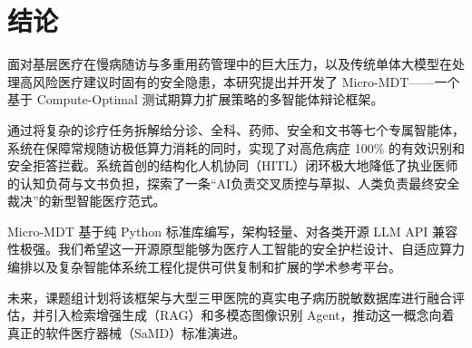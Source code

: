 \documentclass[11pt,a4paper]{ctexart}
\begin{document}
\newpage
\section{结论}

面对基层医疗在慢病随访与多重用药管理中的巨大压力，以及传统单体大模型在处理高风险医疗建议时固有的安全隐患，本研究提出并开发了 Micro-MDT——一个基于 Compute-Optimal 测试期算力扩展策略的多智能体辩论框架。

通过将复杂的诊疗任务拆解给分诊、全科、药师、安全和文书等七个专属智能体，系统在保障常规随访极低算力消耗的同时，实现了对高危病症 100\% 的有效识别和安全拒答拦截。系统首创的结构化人机协同（HITL）闭环极大地降低了执业医师的认知负荷与文书负担，探索了一条“AI负责交叉质控与草拟、人类负责最终安全裁决”的新型智能医疗范式。

Micro-MDT 基于纯 Python 标准库编写，架构轻量、对各类开源 LLM API 兼容性极强。我们希望这一开源原型能够为医疗人工智能的安全护栏设计、自适应算力编排以及复杂智能体系统工程化提供可供复制和扩展的学术参考平台。

未来，课题组计划将该框架与大型三甲医院的真实电子病历脱敏数据库进行融合评估，并引入检索增强生成（RAG）和多模态图像识别 Agent，推动这一概念向着真正的软件医疗器械（SaMD）标准演进。
\end{document}
